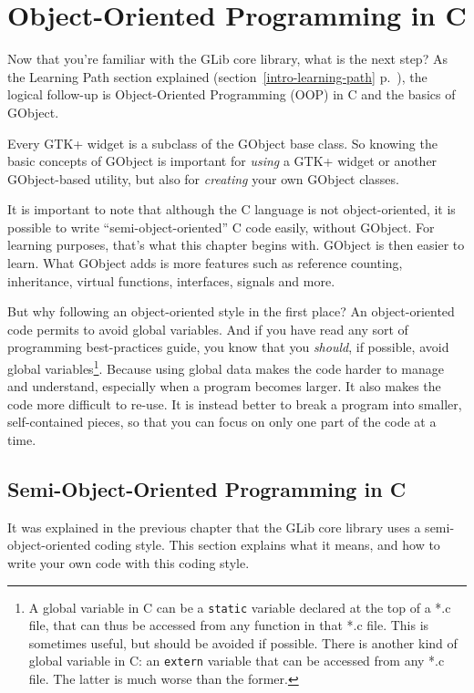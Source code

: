 \chapter{Object-Oriented Programming in C}
\label{oop}

Now that you're familiar with the GLib core library, what is the next step? As the Learning Path section explained (section~\ref{intro-learning-path} p.~\pageref{intro-learning-path}), the logical follow-up is Object-Oriented Programming (OOP) in C and the basics of GObject.

Every GTK+ widget is a subclass of the GObject base class. So knowing the basic concepts of GObject is important for \emph{using} a GTK+ widget or another GObject-based utility, but also for \emph{creating} your own GObject classes.

It is important to note that although the C language is not object-oriented, it is possible to write ``semi-object-oriented'' C code easily, without GObject. For learning purposes, that's what this chapter begins with. GObject is then easier to learn. What GObject adds is more features such as reference counting, inheritance, virtual functions, interfaces, signals and more.

But why following an object-oriented style in the first place? An object-oriented code permits to avoid global variables. And if you have read any sort of programming best-practices guide, you know that you \emph{should}, if possible, avoid global variables\footnote{A global variable in C can be a \lstinline{static} variable declared at the top of a *.c file, that can thus be accessed from any function in that *.c file. This is sometimes useful, but should be avoided if possible. There is another kind of global variable in C: an \lstinline{extern} variable that can be accessed from any *.c file. The latter is much worse than the former.}. Because using global data makes the code harder to manage and understand, especially when a program becomes larger. It also makes the code more difficult to re-use. It is instead better to break a program into smaller, self-contained pieces, so that you can focus on only one part of the code at a time.

\section{Semi-Object-Oriented Programming in C}

It was explained in the previous chapter that the GLib core library uses a semi-object-oriented coding style. This section explains what it means, and how to write your own code with this coding style.

